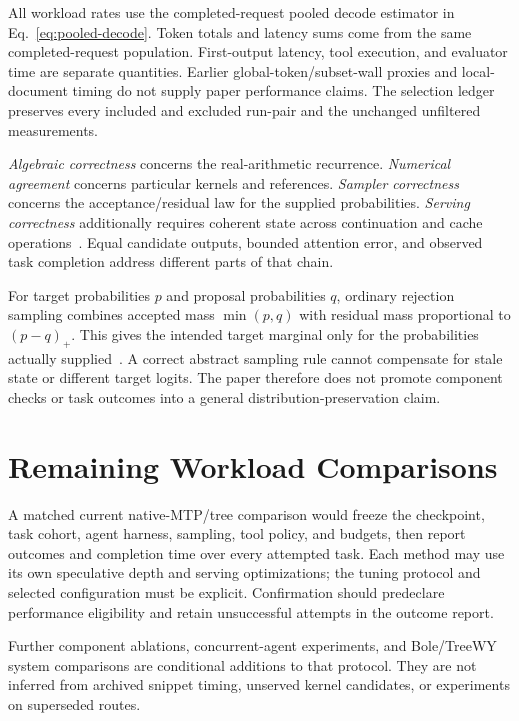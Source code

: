 \documentclass[conference]{IEEEtran}
\begin{document}
All workload rates use the completed-request pooled decode estimator in Eq.~\ref{eq:pooled-decode}. Token totals and latency sums come from the same completed-request population. First-output latency, tool execution, and evaluator time are separate quantities. Earlier global-token/subset-wall proxies and local-document timing do not supply paper performance claims. The selection ledger preserves every included and excluded run-pair and the unchanged unfiltered measurements.

\textit{Algebraic correctness} concerns the real-arithmetic recurrence. \textit{Numerical agreement} concerns particular kernels and references. \textit{Sampler correctness} concerns the acceptance/residual law for the supplied probabilities. \textit{Serving correctness} additionally requires coherent state across continuation and cache operations~\cite{yang2024delta,chen2023sampling,lumo2026archive}. Equal candidate outputs, bounded attention error, and observed task completion address different parts of that chain.

For target probabilities $p$ and proposal probabilities $q$, ordinary rejection sampling combines accepted mass $\min(p,q)$ with residual mass proportional to $(p-q)_+$. This gives the intended target marginal only for the probabilities actually supplied~\cite{leviathan2023fast,chen2023sampling}. A correct abstract sampling rule cannot compensate for stale state or different target logits. The paper therefore does not promote component checks or task outcomes into a general distribution-preservation claim.

\section{Remaining Workload Comparisons}
\label{app:validation}
A matched current native-MTP/tree comparison would freeze the checkpoint, task cohort, agent harness, sampling, tool policy, and budgets, then report outcomes and completion time over every attempted task. Each method may use its own speculative depth and serving optimizations; the tuning protocol and selected configuration must be explicit. Confirmation should predeclare performance eligibility and retain unsuccessful attempts in the outcome report.

Further component ablations, concurrent-agent experiments, and Bole/TreeWY system comparisons are conditional additions to that protocol. They are not inferred from archived snippet timing, unserved kernel candidates, or experiments on superseded routes.

\label{ReferencesStart}


\end{document}
